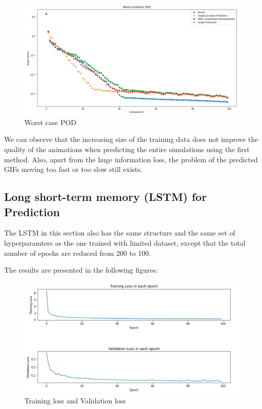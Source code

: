\begin{figure}[H]
    \caption{Worst case POD}
    \includegraphics[scale=0.5]{figures/mantle_convection_images/larger_dataset/FNN_Worst_POD.png}
\end{figure}

We can observe that the increasing size of the training data does not improve the quality of the animations when predicting the entire simulations using the first method. Also, apart from the huge information loss, the problem of the predicted GIFs moving too fast or too slow still exists.


\subsection{Long short-term memory (LSTM) for Prediction}

The LSTM in this section also has the same structure and the same set of hyperparamters as the one trained with limited dataset, except that the total number of epochs are reduced from 200 to 100.

The results are presented in the following figures:

\begin{figure}[H]
    \caption{Training loss and Validation loss}
    \includegraphics[scale=0.6]{figures/mantle_convection_images/larger_dataset/LSTM_trainingData.png}
\end{figure}

